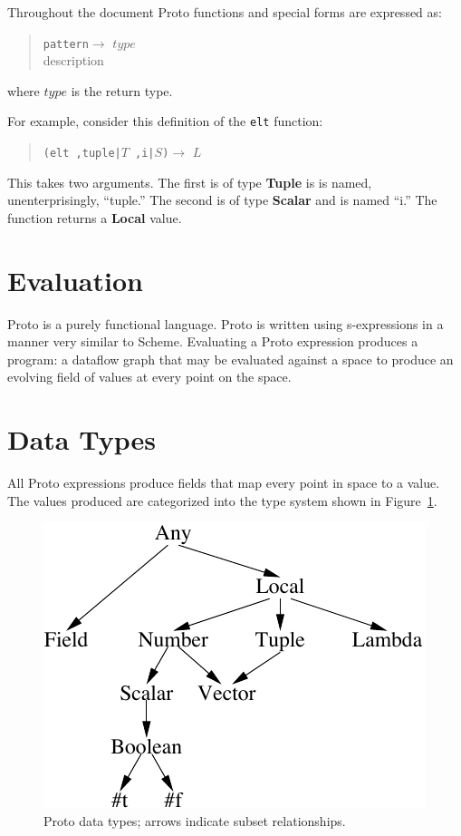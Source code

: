 \documentclass{article}
\newcommand\function[3]
{\begin{quote}{\tt #1}$\rightarrow$ \type{#2} \\ #3 \end{quote}}
\newcommand\type[1]{$#1$}
\newcommand\var[1]{{\tt #1}}
\begin{document}
Throughout the document Proto functions and special forms are
expressed as: 
\function{pattern}{type}{description}
where \type{type} is the return type.

For example, consider this definition of the \var{elt} function:
\begin{quote}
{\tt (elt ,tuple|\type{T} ,i|\type{S})}$\rightarrow$ \type{L}
\end{quote}
This takes two arguments.  The first is of type {\bf Tuple} is is named,
unenterprisingly, ``tuple.'' The second is of type {\bf Scalar} and
is named ``i.''  The function returns a {\bf Local} value.

\section{Evaluation}

Proto is a purely functional language.  Proto is written using
s-expressions in a manner very similar to Scheme.  Evaluating a Proto
expression produces a program: a dataflow graph that may be evaluated
against a space to produce an evolving field of values at every point
on the space.


\section{Data Types}

All Proto expressions produce fields that map every point in space to
a value.  The values produced are categorized into the type system
shown in Figure~\ref{f:types}.

\begin{figure}[hp]
\centering
\includegraphics{figures/types.pdf}
\caption{Proto data types; arrows indicate subset relationships.}
\label{f:types}
\end{figure}
\end{document}
